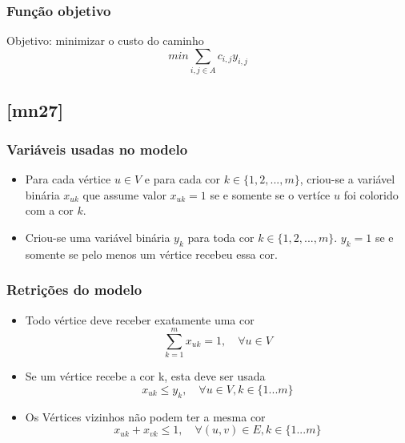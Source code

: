 \documentclass[11pt,letterpaper]{article}
\begin{document}
\subsubsection*{Função objetivo}
Objetivo: minimizar o custo do caminho 
\begin{equation}
min\sum_{{i,j} \in A}c_{i,j}y_{i,j}
\end{equation}

\subsection{{[}mn27{]}}

\subsubsection*{Variáveis usadas no modelo}
\begin{itemize}
\item Para cada vértice $u \in V$ e para cada cor $k \in \{1,2,...,m\}$, criou-se
a variável binária $x_{uk}$ que assume valor $x_{uk}=1$ se e somente se o vertíce $u$ foi
colorido com a cor $k$.

\item Criou-se uma variável binária $y_k$ para toda cor $k \in
  \{1,2,...,m\}$. $y_k=1$ se e somente se pelo menos um vértice recebeu essa cor.
\end{itemize}

\subsubsection*{Retrições do modelo}
\begin{itemize}

\item Todo vértice deve receber exatamente uma cor
\begin{equation*}
  \sum_{k=1}^{m}x_{uk}=1,\quad \forall u \in V
\end{equation*}

\item Se um vértice recebe a cor k, esta deve ser usada
\begin{equation*}
  x_{uk} \leq y_k, \quad\forall u \in V, k \in \{1 ... m\}
\end{equation*}

\item Os Vértices vizinhos não podem ter a mesma cor
\begin{equation*}
  x_{uk} + x_{vk} \leq 1, \quad\forall (u,v) \in E, k \in \{1 ... m\}
\end{equation*}
 
\end{itemize}
\end{document}
